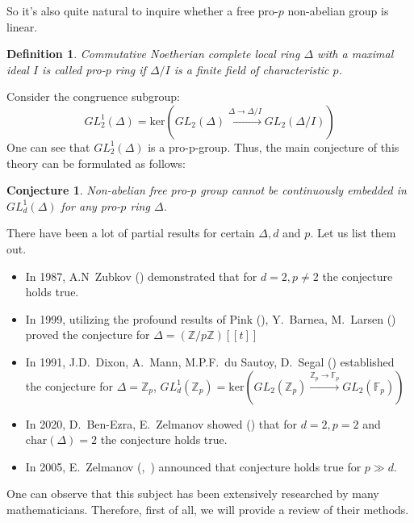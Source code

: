 \documentclass[12pt,a4paper]{article}
\newtheorem*{conjecture*}{Conjecture}
\newtheorem{definition}{Definition}[subsection]
\begin{document}
    So it's also quite natural to inquire whether a free pro-$p$ non-abelian group is linear.

    \vskip 0.1in\noindent
    \begin{definition}
        Commutative Noetherian complete local ring $\Delta$ with a maximal ideal $I$ is called pro-$p$ ring if $\Delta/I$ is a finite field of characteristic $p$.
    \end{definition}
    \vskip 0.1in\noindent

    Consider the congruence subgroup:
    \[GL_2^1(\Delta) = \mathrm{ker}\left( GL_2(\Delta) \xrightarrow{\Delta\to\Delta/I} GL_2(\Delta/I) \right)\]
    One can see that $GL_2^1(\Delta)$ is a pro-p-group.
    Thus, the main conjecture of this theory can be formulated as follows:
    \vskip 0.1in\noindent
    \begin{conjecture*}
        Non-abelian free pro-$p$ group cannot be continuously embedded in $GL_d^1(\Delta)$ for any pro-$p$ ring $\Delta$.
    \end{conjecture*}
    \vskip 0.1in\noindent

    There have been a lot of partial results for certain $\Delta, d$ and $p$.
    Let us list them out.
    \begin{itemize}
        \item In 1987, A.N\ Zubkov (\cite{Zubkov}) demonstrated that for $d=2, p\neq2$ the conjecture holds true.
        \item In 1999, utilizing the profound results of Pink (\cite{Pink}), Y.\ Barnea, M.\ Larsen (\cite{Barnea-Larsen}) proved the conjecture for $\Delta=\left( \mathbb{Z}/p\mathbb{Z} \right)[[t]]$
        \item In 1991, J.D.\ Dixon, A.\ Mann, M.P.F.\ du Sautoy, D.\ Segal (\cite{DMSD}) established the conjecture for $\Delta=\mathbb{Z}_p$, $GL_d^1(\mathbb{Z}_p)=\mathrm{ker}\left( GL_2(\mathbb{Z}_p) \xrightarrow{\mathbb{Z}_p\to\mathbb{F}_p} GL_2(\mathbb{F}_p) \right)$
        \item In 2020, D.\ Ben-Ezra, E.\ Zelmanov showed (\cite{Ben-Ezra-Zelmanov}) that for $d=2, p=2$ and $\mathrm{char}(\Delta)=2$  the conjecture holds true.
        \item In 2005, E.\ Zelmanov (\cite{Zelmanov1},~\cite{Zelmanov2}) announced that conjecture holds true for $p\gg d$.
    \end{itemize}


    One can observe that this subject has been extensively researched by many mathematicians.
    Therefore, first of all, we will provide a review of their methods.
\end{document}
